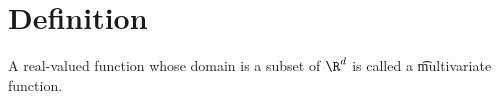 

\section*{Definition}

A real-valued function whose domain is a subset of $\R ^d$ is called a \t{multivariate function}.

\blankpage